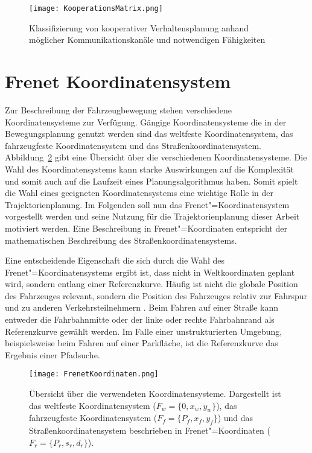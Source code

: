 \begin{figure}[!htbp]
    \centering
    \texttt{[image: KooperationsMatrix.png]}
    \caption[Kooperationsmatrix]{Klassifizierung von kooperativer Verhaltensplanung anhand m\"oglicher Kommunikationskan\"ale und notwendigen F\"ahigkeiten \cite{Ulbrich2015}}
    \label{fig:coopMatrice}
\end{figure}




\FloatBarrier


\section{Frenet Koordinatensystem}
\label{sec:Frenet}
Zur Beschreibung der Fahrzeugbewegung stehen verschiedene Koordinatensysteme zur Verf\"ugung. 
G\"angige Koordinatensysteme die in der Bewegungsplanung genutzt werden sind das weltfeste Koordinatensystem, das fahrzeugfeste Koordinatensystem und das Stra{\ss}enkoordinatensystem. 
Abbildung~\ref{fig:FrenetKoord} gibt eine \"Ubersicht \"uber die verschiedenen Koordinatensysteme.
Die Wahl des Koordinatensystems kann starke Auswirkungen auf die Komplexit\"at und somit auch auf die Laufzeit eines Planungsalgorithmus haben. 
Somit spielt die Wahl eines geeigneten Koordinatensystems eine wichtige Rolle in der Trajektorienplanung.
Im Folgenden soll nun das Frenet"=Koordinatensystem vorgestellt werden und seine Nutzung f\"ur die Trajektorienplanung dieser Arbeit motiviert werden.
Eine Beschreibung in Frenet"=Koordinaten entspricht der mathematischen Beschreibung des Stra{\ss}enkoordinatensystems. \cite{Rathgeber2016}

Eine entscheidende Eigenschaft die sich durch die Wahl des Frenet"=Koordinatensystems ergibt ist, dass nicht in Weltkoordinaten geplant wird, sondern entlang einer Referenzkurve.
H\"aufig ist nicht die globale Position des Fahrzeuges relevant, sondern die Position des Fahrzeuges relativ zur Fahrspur und zu anderen Verkehrsteilnehmern \cite{Rathgeber2016}.
Beim Fahren auf einer Stra{\ss}e kann entweder die Fahrbahnmitte oder der linke oder rechte Fahrbahnrand als Referenzkurve gew\"ahlt werden. 
Im Falle einer unstrukturierten Umgebung, beispielsweise beim Fahren auf einer Parkfl\"ache, ist die Referenzkurve das Ergebnis einer Pfadsuche.  \cite{Werling2011}

\begin{figure}[!htbp]
    \centering
    \texttt{[image: FrenetKoordinaten.png]}
    \caption[Koordinatensysteme]{\"Ubersicht \"uber die verwendeten Koordinatensysteme. Dargestellt ist das weltfeste Koordinatensystem (\(F_w = \{0, x_w, y_w\}\)), das fahrzeugfeste Koordinatensystem (\(F_f = \{P_f, x_f, y_f\}\)) und das Stra{\ss}enkoordinatensystem beschrieben in Frenet"=Koordinaten (\(F_r = \{P_r, s_r, d_r\}\)). \cite{Rathgeber2016}}
    \label{fig:FrenetKoord}
\end{figure}

